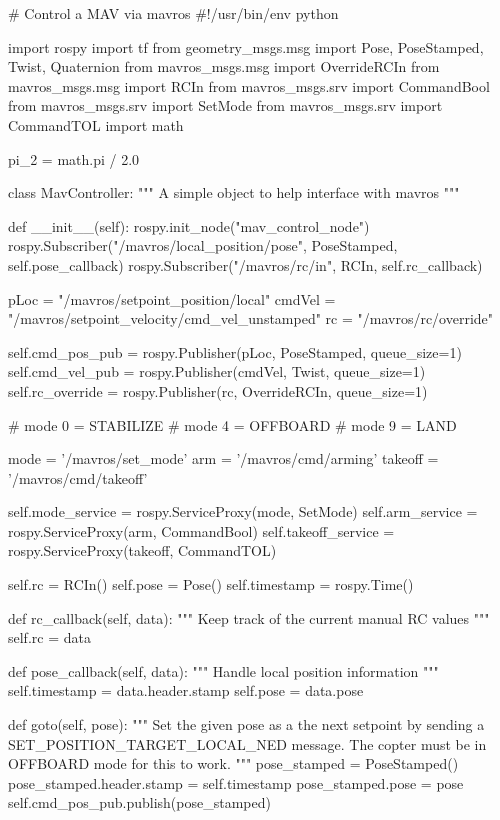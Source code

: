 \documentclass[a4paper,12pt]{article}
\begin{document}
\begin{MyCode}

# Control a MAV via mavros
#!/usr/bin/env python

import rospy
import tf
from geometry_msgs.msg import Pose, PoseStamped, Twist, Quaternion
from mavros_msgs.msg import OverrideRCIn
from mavros_msgs.msg import RCIn
from mavros_msgs.srv import CommandBool
from mavros_msgs.srv import SetMode
from mavros_msgs.srv import CommandTOL
import math

pi_2 = math.pi / 2.0

class MavController:
	"""
	A simple object to help interface with mavros
	"""
	
	def __init__(self):
		rospy.init_node("mav_control_node")
		rospy.Subscriber("/mavros/local_position/pose",
				 PoseStamped, self.pose_callback)
		rospy.Subscriber("/mavros/rc/in", RCIn,
				 self.rc_callback)
		
		pLoc = "/mavros/setpoint_position/local"
		cmdVel = "/mavros/setpoint_velocity/cmd_vel_unstamped"
		rc = "/mavros/rc/override"
		
		self.cmd_pos_pub = rospy.Publisher(pLoc, PoseStamped,
				 		  queue_size=1)
		self.cmd_vel_pub = rospy.Publisher(cmdVel, Twist,
						   queue_size=1)
		self.rc_override = rospy.Publisher(rc, OverrideRCIn,
						   queue_size=1)
		
		# mode 0 = STABILIZE
		# mode 4 = OFFBOARD
		# mode 9 = LAND
		
		mode = '/mavros/set_mode'
		arm = '/mavros/cmd/arming'
		takeoff = '/mavros/cmd/takeoff'
		
		self.mode_service = rospy.ServiceProxy(mode, SetMode)
		self.arm_service = rospy.ServiceProxy(arm,
						      CommandBool)
		self.takeoff_service = rospy.ServiceProxy(takeoff,
						          CommandTOL)
		
		self.rc = RCIn()
		self.pose = Pose()
		self.timestamp = rospy.Time()
		
	def rc_callback(self, data):
		"""
		Keep track of the current manual RC values
		"""
		self.rc = data
		
	def pose_callback(self, data):
		"""
		Handle local position information
		"""
		self.timestamp = data.header.stamp
		self.pose = data.pose
		
	def goto(self, pose):
		"""
		Set the given pose as a the next setpoint by sending
		a SET_POSITION_TARGET_LOCAL_NED message.
		The copter must be in OFFBOARD mode for this to work.
		"""
		pose_stamped = PoseStamped()
		pose_stamped.header.stamp = self.timestamp
		pose_stamped.pose = pose
		self.cmd_pos_pub.publish(pose_stamped)
		

\end{MyCode}
\end{document}
